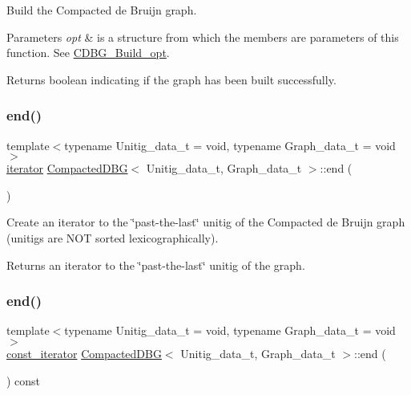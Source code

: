 Build the Compacted de Bruijn graph. 


\begin{DoxyParams}{Parameters}
{\em opt} & is a structure from which the members are parameters of this function. See \hyperlink{structCDBG__Build__opt}{C\+D\+B\+G\+\_\+\+Build\+\_\+opt}. \\
\hline
\end{DoxyParams}
\begin{DoxyReturn}{Returns}
boolean indicating if the graph has been built successfully. 
\end{DoxyReturn}
\mbox{\label{classCompactedDBG_ad8629de8e7d29ba9bca59c1179b1f88f}} 
\subsubsection{\texorpdfstring{end()}{end()}\hspace{0.1cm}{\footnotesize\ttfamily [1/2]}}
{\footnotesize\ttfamily template$<$typename Unitig\+\_\+data\+\_\+t = void, typename Graph\+\_\+data\+\_\+t = void$>$ \\
\hyperlink{classCompactedDBG_af4a6df70628f698d9a2ee843b5359883}{iterator} \hyperlink{classCompactedDBG}{Compacted\+D\+BG}$<$ Unitig\+\_\+data\+\_\+t, Graph\+\_\+data\+\_\+t $>$\+::end (\begin{DoxyParamCaption}{ }\end{DoxyParamCaption})}



Create an iterator to the \char`\"{}past-\/the-\/last\char`\"{} unitig of the Compacted de Bruijn graph (unitigs are N\+OT sorted lexicographically). 

\begin{DoxyReturn}{Returns}
an iterator to the \char`\"{}past-\/the-\/last\char`\"{} unitig of the graph. 
\end{DoxyReturn}
\mbox{\label{classCompactedDBG_a9145ad4ca08f9be984cb85a1ab6477f3}} 
\subsubsection{\texorpdfstring{end()}{end()}\hspace{0.1cm}{\footnotesize\ttfamily [2/2]}}
{\footnotesize\ttfamily template$<$typename Unitig\+\_\+data\+\_\+t = void, typename Graph\+\_\+data\+\_\+t = void$>$ \\
\hyperlink{classCompactedDBG_a7725fc78ad52227df1f70d9b8f44622c}{const\+\_\+iterator} \hyperlink{classCompactedDBG}{Compacted\+D\+BG}$<$ Unitig\+\_\+data\+\_\+t, Graph\+\_\+data\+\_\+t $>$\+::end (\begin{DoxyParamCaption}{ }\end{DoxyParamCaption}) const}



